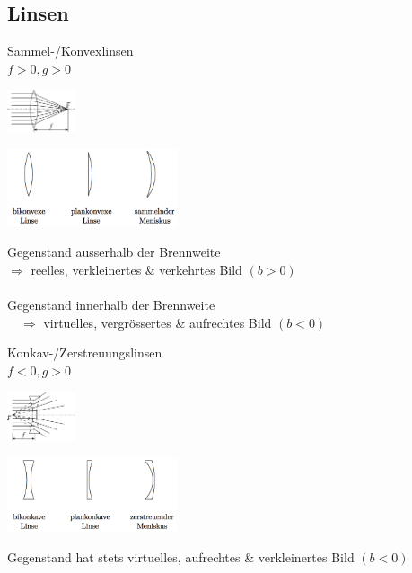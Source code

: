 \subsection{Linsen  }
\begin{minipage}[]{3.5cm}
  Sammel-/Konvexlinsen\\
  $f>0,g>0$
\end{minipage}
\begin{minipage}[]{2cm}
  \includegraphics[width=2cm]{./bilder/sammelprinzip.png}
\end{minipage}
\begin{minipage}[]{5cm}
  \includegraphics[width=5cm]{./bilder/sammellinsen.png}
\end{minipage}
\begin{minipage}[]{7.5cm}
  \small
  Gegenstand ausserhalb der Brennweite \\
  $\Rightarrow$ reelles, verkleinertes \& verkehrtes Bild $(b>0)$\\ \\
  Gegenstand innerhalb der Brennweite \\
  $\quad \Rightarrow$ virtuelles, vergrössertes \& aufrechtes Bild $(b<0)$
\end{minipage}

\begin{minipage}[]{3.5cm}
  Konkav-/Zerstreuungslinsen\\
  $f<0,g>0$
\end{minipage}
\begin{minipage}[]{2cm}
  \includegraphics[width=2cm]{./bilder/streuprinzip.png}
\end{minipage}
\begin{minipage}[]{5cm}
  \includegraphics[width=5cm]{./bilder/streulinsen.png}
\end{minipage}
\begin{minipage}[]{7.5cm}
  \small
  Gegenstand hat stets virtuelles, aufrechtes \& verkleinertes Bild $(b<0)$
\end{minipage}

